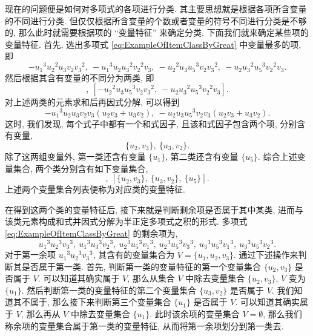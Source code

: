 \documentclass[10pt,a4paper]{ctexart}
\begin{document}
现在的问题便是如何对多项式的各项进行分类. 其主要思想就是根据各项所含变量的不同进行分类. 但仅仅根据所含变量的个数或者变量的符号不同进行分类是不够的, 那么此时就需要根据项的 ``变量特征'' 来确定分类. 下面我们就来确定某些项的变量特征. 首先, 选出多项式 \eqref{eq:ExampleOfItemClassByGreat} 中变量最多的项, 即
\begin{equation*}
  - {u_{{1}}}^{3}{u_{{2}}}^{2}u_{{3}}v_{{2}}{v_{{3}}}^{2},\ - {u_{{1}}}^{3}u_{{2}}{u_{{3}}}^{2}{v_{{2}}}^{2}v_{{3}},\ - {u_{{2}}}^{2}u_{{3}}{u_{{5}}}^{3}v_{{2}}{v_{{3}}}^{2},\ - u_{{2}}{u_{{3}}}^{2}{u_{{5}}}^{3}{v_{{2}}}^{2}v_{{3}}.
\end{equation*}
然后根据其含有变量的不同分为两类, 即
\begin{equation*}
  [- {u_{{1}}}^{3}{u_{{2}}}^{2}u_{{3}}v_{{2}}{v_{{3}}}^{2},\ - {u_{{1}}}^{3}u_{{2}}{u_{{3}}}^{2}{v_{{2}}}^{2}v_{{3}}],\ [- {u_{{2}}}^{2}u_{{3}}{u_{{5}}}^{3}v_{{2}}{v_{{3}}}^{2},\ - u_{{2}}{u_{{3}}}^{2}{u_{{5}}}^{3}{v_{{2}}}^{2}v_{{3}}].
\end{equation*}
对上述两类的元素求和后再因式分解, 可以得到
\begin{equation*}
  -{u_{{1}}}^{3}u_{{2}}u_{{3}}v_{{2}}v_{{3}} \left( u_{{2}}v_{{3}}+u_{{3}}v_{{2}} \right),\ -u_{{2}}u_{{3}}{u_{{5}}}^{3}v_{{2}}v_{{3}} \left( u_{{2}}v_{{3}}+u_{{3}}v_{{2}} \right).
\end{equation*}
这时, 我们发现, 每个式子中都有一个和式因子, 且该和式因子包含两个项, 分别含有变量,
\begin{equation*}
  \{u_2, v_3\},\ \{u_3, v_2\}.
\end{equation*}
除了这两组变量外, 第一类还含有变量 $\{u_1\}$, 第二类还含有变量 $\{u_5\}$. 综合上述变量集合, 两个类分别含有如下变量集合,
\begin{equation*}
  [\{u_2, v_3\},\ \{u_3, v_2\},\ \{u_1\}],\ [\{u_2, v_3\},\ \{u_3, v_2\},\ \{u_5\}].
\end{equation*}
上述两个变量集合列表便称为对应类的变量特征.

在得到这两个类的变量特征后, 接下来就是判断剩余项是否属于其中某类, 进而与该类元素构成和式并因式分解为半正定多项式之积的形式. 多项式 \eqref{eq:ExampleOfItemClassByGreat} 的剩余项为,
\begin{equation*}
  {u_{{1}}}^{3}{u_{{2}}}^{3}{v_{{3}}}^{3},\ {u_{{1}}}^{3}{u_{{3}}}^{3}{v_{{2}}}^{3},\ {u_{{2}}}^{3}{u_{{5}}}^{3}{v_{{1}}}^{3},\ {u_{{2}}}^{3}{u_{{5}}}^{3}{v_{{3}}}^{3},\  {u_{{3}}}^{3}{u_{{5}}}^{3}{v_{{1}}}^{3},\ {u_{{3}}}^{3}{u_{{5}}}^{3}{v_{{2}}}^{3}.
\end{equation*}
对于第一余项 ${u_{{1}}}^{3}{u_{{2}}}^{3}{v_{{3}}}^{3}$, 其含有的变量集合为 $V = \{u_1, u_2, v_3\}$. 通过下述操作来判断其是否属于第一类. 首先, 判断第一类的变量特征的第一个变量集合 $\{u_2, v_3\}$ 是否属于 $V$. 可以知道其确实属于 $V$, 那么从集合 $V$ 中除去变量集合 $\{u_2, v_3\}$, $V$ 变为 $\{u_1\}$. 然后判断第一类的变量特征的第二个变量集合 $\{u_3, v_2\}$ 是否属于 $V$. 我们知道其不属于, 那么接下来判断第三个变量集合 $\{u_1\}$ 是否属于 $V$. 可以知道其确实属于 $V$, 那么再从 $V$ 中除去变量集合 $\{u_1\}$. 此时该余项的变量集合 $V = \emptyset$, 那么我们称余项的变量集合属于第一类的变量特征, 从而将第一余项划分到第一类去.
\end{document}
